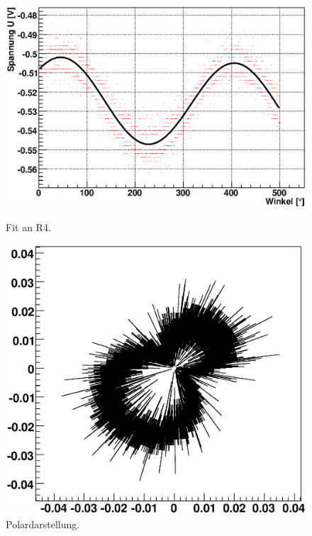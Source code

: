 \documentclass[12pt]{article}
\begin{document}
\begin{figure}[H]  
\begin{minipage}{0.5\linewidth}
\centering
\includegraphics[width=0.9\linewidth]{pictures/R4.eps}
\caption{Fit an R4.}
\end{minipage}
\begin{minipage}{0.5\linewidth}
\centering 
\includegraphics[width=0.9\linewidth]{pictures/R4vd.eps}
\caption{Polardarstellung.}
\end{minipage}
\end{figure}
\end{document}
